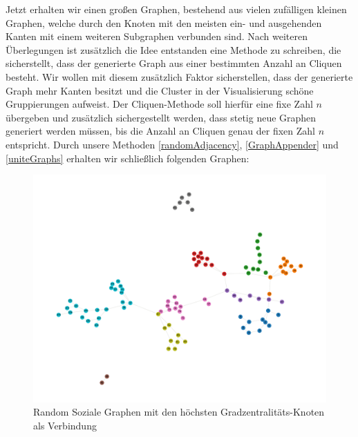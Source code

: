 Jetzt erhalten wir einen großen Graphen, bestehend aus vielen zufälligen kleinen Graphen, welche durch den Knoten mit den meisten ein- und ausgehenden Kanten mit einem weiteren Subgraphen verbunden sind.
Nach weiteren Überlegungen ist zusätzlich die Idee entstanden eine Methode zu schreiben, die sicherstellt, dass der generierte Graph aus einer bestimmten Anzahl an Cliquen besteht. Wir wollen mit diesem zusätzlich Faktor sicherstellen, dass der generierte Graph mehr Kanten besitzt und die Cluster in der Visualisierung schöne Gruppierungen aufweist. Der Cliquen-Methode soll hierfür eine fixe Zahl $n$ übergeben und zusätzlich sichergestellt werden, dass stetig neue Graphen generiert werden müssen, bis die Anzahl an Cliquen genau der fixen Zahl $n$ entspricht.
Durch unsere Methoden \ref{randomAdjacency}, \ref{GraphAppender} und \ref{uniteGraphs} erhalten wir schließlich folgenden Graphen:

\FloatBarrier
\begin{figure}[h!]
    \centering
    \hspace*{-1.5cm}
    \includegraphics[width=1.0\textwidth]{Graphics/NearSocialNetwork.png}
    \caption{Random Soziale Graphen mit den höchsten Gradzentralitäts-Knoten als Verbindung }
    \label{NearSozialerGraph}
\end{figure}

